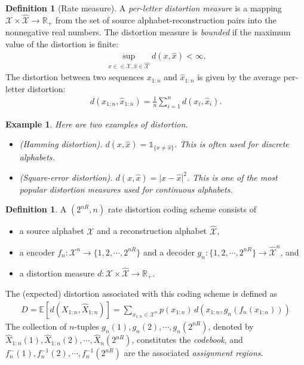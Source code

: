 \documentclass{article}
\numberwithin{equation}{section}
\newcommand{\E}{\mathbb{E}}
\newcommand{\bbR}{\mathbb{R}}
\renewcommand{\cal}{\mathcal}
\newcommand{\wh}{\widehat}
\theoremstyle{plain}
\newtheorem{example}[theorem]{Example}
\theoremstyle{definition}
\newtheorem{definition}[theorem]{Definition}
\begin{document}
\begin{definition}[Rate measure]
A \textit{per-letter distortion measure} is a mapping $\cal{X}\times\wh{\cal{X}}\to\bbR_+$ from the set of source alphabet-reconstruction pairs into the nonnegative real numbers. The distortion measure is \textit{bounded} if the maximum value of the distortion is finite:
\begin{align*}
	\sup_{x\in\in\cal{X},\wh{x}\in\wh{\cal{X}}}d(x,\hat{x})<\infty.
\end{align*}
The distortion between two sequences $x_{1:n}$ and $\wh{x}_{1:n}$ is given by the average per-letter distortion:
\begin{align*}
	d(x_{1:n},\wh{x}_{1:n})=\frac{1}{n}\sum_{i=1}^n d(x_i,\wh{x}_i).
\end{align*}
\end{definition}
\begin{example} Here are two examples of distortion.
\begin{itemize}
\item[(i)] (Hamming distortion). $d(x,\wh{x})=\mathds{1}_{\{x\neq\wh{x}\}}$. This is often used for discrete alphabets.
\item[(ii)] (Square-error distortion). $d(x,\wh{x})=\vert x-\wh{x}\vert^2$. This is one of the most popular distortion measures used for continuous alphabets.
\end{itemize}
\end{example}
\begin{definition}
A $(2^{nR}, n)$ rate distortion coding scheme consists of
\begin{itemize}
\item a source alphabet $\cal{X}$ and a reconstruction alphabet $\wh{\cal{X}}$,
\item a encoder $f_n:\cal{X}^n\to\{1,2,\cdots,2^{nR}\}$ and a decoder $g_n:\{1,2,\cdots,2^{nR}\}\to\wh{\cal{X}}^n$, and
\item a distortion measure $d:\cal{X}\times\wh{\cal{X}}\to\bbR_+$.
\end{itemize}
The (expected) distortion associated with this coding scheme is defined as
\begin{align*}
	D=\E\left[d(X_{1:n},\wh{X}_{1:n})\right]=\sum_{x_{1:n}\in\cal{X}^n}p(x_{1:n})\,d(x_{1:n},g_n(f_n(x_{1:n})))
\end{align*}
The collection of $n$-tuples $g_n(1),g_n(2),\cdots,g_n(2^{nR})$, denoted by $\wh{X}_{1:n}(1),\wh{X}_{1:n}(2),\cdots,\wh{X}_n(2^{nR})$, constitutes the \textit{codebook}, and $f^{-}_n(1),f^{-1}_n(2),\cdots,f^{-1}_n(2^{nR})$ are the associated \textit{assignment regions}.
\end{definition}
\end{document}

